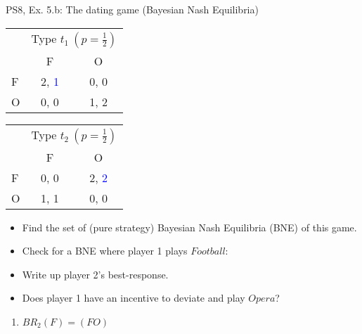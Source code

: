 \begin{frame}{PS8, Ex. 5.b: The dating game (Bayesian Nash Equilibria)}
    \begin{table}
      \begin{tabular}{l|c|c|}
        \multicolumn{1}{c}{} & \multicolumn{2}{c}{Type $t_1\ (p=\frac{1}{2})$} \\
        \multicolumn{1}{c}{} & \multicolumn{1}{c}{F} & \multicolumn{1}{c}{O} \\\cline{2-3}
        F & 2, \textcolor{blue}{1} & 0, 0 \\\cline{2-3}
        O & 0, 0 & 1, 2 \\\cline{2-3}
      \end{tabular}\quad\quad
      \begin{tabular}{l|c|c|}
        \multicolumn{1}{c}{} & \multicolumn{2}{c}{Type $t_2\ (p=\frac{1}{2})$} \\
        \multicolumn{1}{c}{} & \multicolumn{1}{c}{F} & \multicolumn{1}{c}{O} \\\cline{2-3}
        F & 0, 0 & 2, \textcolor{blue}{2} \\\cline{2-3}
        O & 1, 1 & 0, 0 \\\cline{2-3}
      \end{tabular}
    \end{table}
    \begin{itemize}
      \item[(b)] Find the set of (pure strategy) Bayesian Nash Equilibria (BNE) of this game.
    \end{itemize}
    \begin{multicols}{2}
      \begin{itemize}
        \item[Step 1:] Check for a BNE where player 1 plays $Football$:
        \item[1.a:] Write up player 2's best-response.
        \item[1.b:] Does player 1 have an incentive to deviate and play $Opera$?
      \end{itemize}
      \vfill\null\columnbreak
      \begin{enumerate}
        \item[1.a:] $BR_2(F)=(FO)$
      \end{enumerate}
      \vfill\null
    \end{multicols}
\end{frame}
